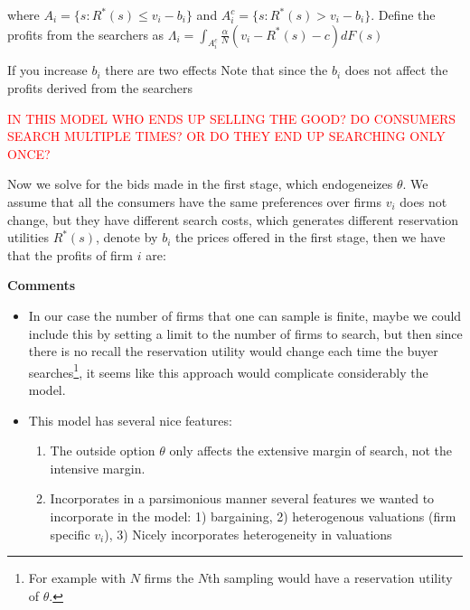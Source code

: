 \documentclass[12pt]{article}
\theoremstyle{plain}
\theoremstyle{plain}
\begin{document}
where $A_i = \{s: R^*(s) \leq v_i-b_i\}$ and $A_i^c = \{s: R^*(s) > v_i-b_i\}$. Define the profits from the searchers as $\Lambda_i = \int_{A_i^c} \frac{\alpha}{N} ( v_i - R^*(s)- c) dF(s)$

\vspace{2cm}

If you increase $b_i$ there are two effects 
Note that since the $b_i$ does not affect the profits derived from the searchers




\vspace{3cm}

\textcolor{red}{IN THIS MODEL WHO ENDS UP SELLING THE GOOD? DO CONSUMERS SEARCH MULTIPLE TIMES? OR DO THEY END UP SEARCHING ONLY ONCE?}






Now we solve for the bids made in the first stage, which endogeneizes $\theta$. We assume that all the consumers have the same preferences over firms $v_i$ does not change, but they have different search costs, which generates different reservation utilities $R^*(s)$, denote by $b_i$ the prices offered in the first stage, then we have that the profits of firm $i$ are: 



\textbf{Comments} 
\begin{itemize}
    \item In our case the number of firms that one can sample is finite, maybe we could include this by setting a limit to the number of firms to search, but then since there is no recall the reservation utility would change each time the buyer searches\footnote{For example with $N$ firms the $N$th sampling would have a reservation utility of $\theta$.}, it seems like this approach would complicate considerably the model. 

    \item This model has several nice features: 
    \begin{enumerate}
        \item The outside option $\theta$ only affects the extensive margin of search, not the intensive margin. 
        \item Incorporates in a parsimonious manner several features we wanted to incorporate in the model: 1) bargaining, 2) heterogenous valuations (firm specific $v_i$), 3) Nicely incorporates heterogeneity in valuations  
    \end{enumerate}
\end{itemize}
\end{document}
